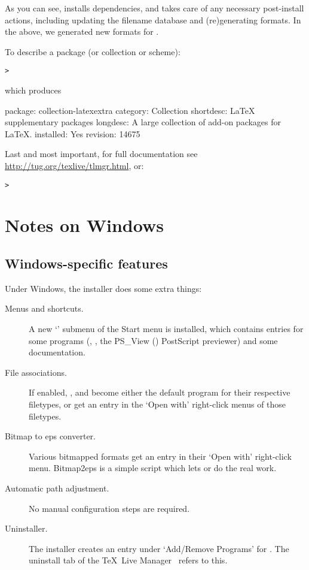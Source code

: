 \documentclass{article}
\begin{document}
As you can see,  installs dependencies, and takes care of any
necessary post-install actions, including updating the filename database
and (re)generating formats.  In the above, we generated new formats for
\XeTeX.

To describe a package (or collection or scheme):
\begin{alltt}
> 
\end{alltt}
which produces
\begin{fverbatim}
package:    collection-latexextra
category:   Collection
shortdesc:  LaTeX supplementary packages
longdesc:   A large collection of add-on packages for LaTeX.
installed:  Yes
revision:   14675
\end{fverbatim}

Last and most important, for full documentation see
\url{http://tug.org/texlive/tlmgr.html}, or:
\begin{alltt}
> 
\end{alltt}


\section{Notes on Windows}
\label{sec:windows}

\subsection{Windows-specific features}
\label{sec:winfeatures}

Under Windows, the installer does some extra things:
\begin{description}
\item[Menus and shortcuts.] A new `\TL{}' submenu of the
  Start menu is installed, which contains entries for some \GUI{}
  programs (, , the PS\_View ()
  PostScript previewer) and some documentation.
\item[File associations.] If enabled, , 
  and  become either the default program for
  their respective filetypes, or get an entry in the `Open with'
  right-click menus of those filetypes.
\item[Bitmap to eps converter.] Various bitmapped formats get an
  entry  in their `Open with' right-click
  menu. Bitmap2eps is a simple script which lets  or
   do the real work.
\item[Automatic path adjustment.] No manual configuration steps are required.
\item[Uninstaller.] The installer creates an entry under `Add/Remove
  Programs' for \TL. The uninstall tab of the \TeX\ Live Manager \GUI\
  refers to this.
\end{description}
\end{document}
